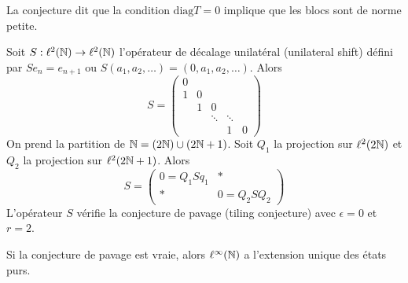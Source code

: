 La conjecture dit que la condition $\mathrm{diag}T = 0$ implique que les blocs sont de norme petite.

\begin{ex}
Soit $S: \ell^2(\mathbb{N}) \to \ell^2(\mathbb{N})$ l'opérateur de décalage
  unilatéral (\og unilateral shift\fg{}) défini par $Se_n = e_{n+1}$ ou
  $S(a_1, a_2, \ldots) = (0, a_1, a_2, \ldots)$. Alors
  \[ S =
    \begin{pmatrix}
      0 &   &        &   & \\
      1 & 0 &        &   & \\
        & 1 & 0 &   & \\
        &   & \ddots & \ddots  & \\
        &   &        & 1 & 0
    \end{pmatrix}
\] On prend la partition de $\mathbb{N} = (2\mathbb{N}) \cup (2\mathbb{N} + 1)$. Soit $Q_1$ la
  projection sur $\ell^2(2\mathbb{N})$ et $Q_2$ la projection sur $\ell^2 (2\mathbb{N} + 1)$. Alors 
  \[ S =
    \begin{pmatrix}
      0 = Q_1Sq_1 & \ast \\ \ast & 0 = Q_2SQ_2
    \end{pmatrix}
  \]
  L'opérateur $S$ vérifie la conjecture de pavage (\og tiling conjecture\fg{}) avec $\epsilon = 0$ et $r = 2$.
\end{ex}

\begin{prop}
  Si la conjecture de pavage est vraie, alors 
  $ \ell^\infty(\mathbb{N}) $ a l'extension unique des états purs.
\end{prop}

